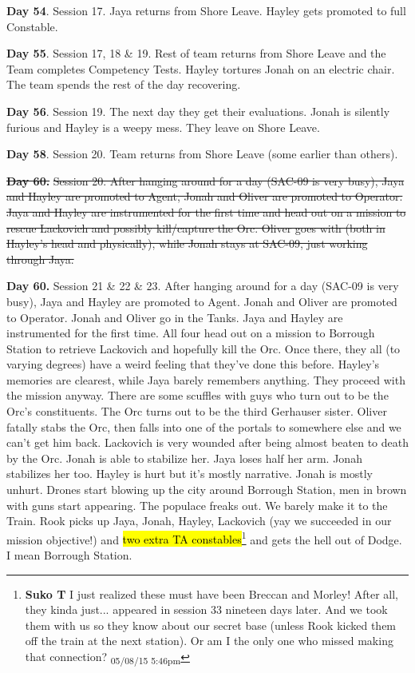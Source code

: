 \textbf{Day 54}. Session 17.  Jaya returns from Shore Leave.  Hayley gets promoted to full Constable.

\textbf{Day 55}. Session 17, 18 \& 19. Rest of team returns from Shore Leave and the Team completes Competency Tests.  Hayley tortures Jonah on an electric chair.  The team spends the rest of the day recovering. 

\textbf{Day 56}. Session 19. The next day they get their evaluations.  Jonah is silently furious and Hayley is a weepy mess.  They leave on Shore Leave.

\textbf{Day 58}.  Session 20.  Team returns from Shore Leave (some earlier than others).  

\sout{ \textbf{Day 60.} }\sout{   Session 20.  After hanging around for a day (SAC-09 is very busy), Jaya and Hayley are promoted to Agent, Jonah and Oliver are promoted to Operator.  Jaya and Hayley are instrumented for the first time and head out on a mission to rescue Lackovich and possibly kill/capture the Orc.  Oliver goes with (both in Hayley's head and physically), while Jonah stays at SAC-09, just working through Jaya. }

\textbf{Day 60.}  Session 21 \& 22 \& 23.  After hanging around for a day (SAC-09 is very busy), Jaya and Hayley are promoted to Agent.  Jonah and Oliver are promoted to Operator.  Jonah and Oliver go in the Tanks.  Jaya and Hayley are instrumented for the first time.  All four head out on a mission to Borrough Station to retrieve Lackovich and hopefully kill the Orc.  Once there, they all (to varying degrees) have a weird feeling that they've done this before.  Hayley's memories are clearest, while Jaya barely remembers anything.  They proceed with the mission anyway.  There are some scuffles with guys who turn out to be the Orc's constituents.  The Orc turns out to be the third Gerhauser sister.  Oliver fatally stabs the Orc, then falls into one of the portals to somewhere else and we can't get him back.  Lackovich is very wounded after being almost beaten to death by the Orc.  Jonah is able to stabilize her.  Jaya loses half her arm.  Jonah stabilizes her too.  Hayley is hurt but it's mostly narrative.  Jonah is mostly unhurt.  Drones start blowing up the city around Borrough Station, men in brown with guns start appearing.  The populace freaks out.  We barely make it to the Train. Rook picks up Jaya, Jonah, Hayley, Lackovich (yay we succeeded in our mission objective!) and \hl{two extra TA constables}\footnote{\textbf{Suko T }I just realized these must have been Breccan and Morley!  After all, they kinda just... appeared in session 33 nineteen days later.  And we took them with us so they know about our secret base (unless Rook kicked them off the train at the next station). Or am I the only one who missed making that connection? \textsubscript{05/08/15 5:46pm}} and gets the hell out of Dodge.  I mean Borrough Station.


